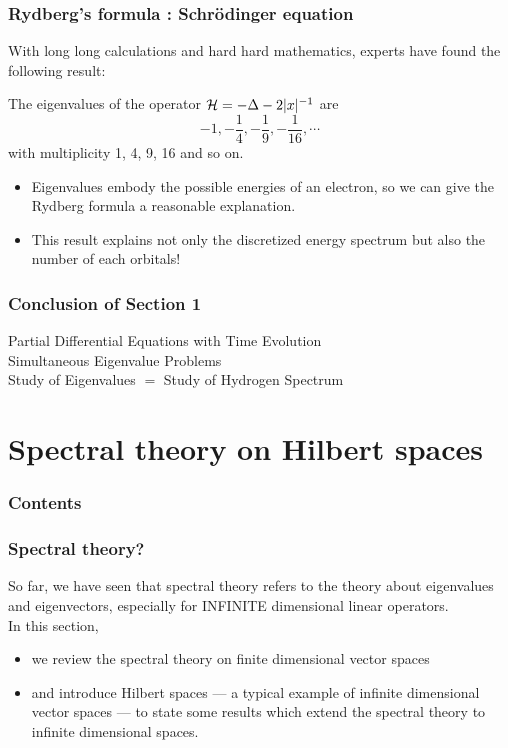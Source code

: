 \documentclass{beamer}
\begin{document}
\begin{frame}
\frametitle{Rydberg's formula : Schr\"odinger equation}
  With long long calculations and hard hard mathematics, experts have found the following result: \pause
  \begin{prop}
    The eigenvalues of the operator $\mathcal{H}=-\Delta-2|x|^{-1}$ are \pause
    \[-1,-\frac14,-\frac19,-\frac1{16},\cdots\]
    \pause with multiplicity 1, 4, 9, 16 and so on.
  \end{prop}
  \begin{itemize}[<+->]
    \item Eigenvalues embody the possible energies of an electron, so we can give the Rydberg formula a reasonable explanation.
    \item This result explains not only the discretized energy spectrum but also the number of each orbitals!
  \end{itemize}
\end{frame}

\begin{frame}
\frametitle{Conclusion of Section 1}
  \begin{rd}
  Partial Differential Equations with Time Evolution \\
  Simultaneous Eigenvalue Problems  \\
  Study of Eigenvalues $=$ Study of Hydrogen Spectrum
  \end{rd}
\end{frame}

\section{Spectral theory on Hilbert spaces}
\begin{frame}
\frametitle{Contents}
  \tableofcontents[currentsection]
\end{frame}

\begin{frame}
\frametitle{Spectral theory?}
  So far, we have seen that spectral theory refers to the theory about eigenvalues and eigenvectors, \pause especially for INFINITE dimensional linear operators.\\
  \pause In this section,
  \begin{itemize}
    \item we review the spectral theory on finite dimensional vector spaces
    \item and introduce Hilbert spaces --- a typical example of infinite dimensional vector spaces --- to state some results which extend the spectral theory to infinite dimensional spaces.
  \end{itemize}
\end{frame}
\end{document}
